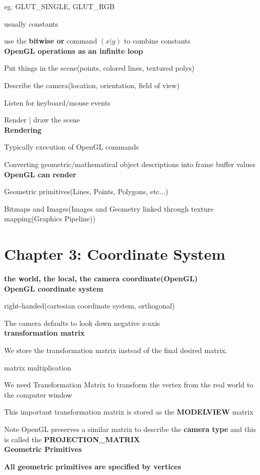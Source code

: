 \documentclass[]{report}
\begin{document}
eg. GLUT\_SINGLE, GLUT\_RGB

usually constants

use the \textbf{bitwise or} command $(x|y)$ to combine constants\\
\textbf{OpenGL operations as an infinite loop}

Put things in the scene(points, colored lines, textured polys)

Describe the camera(location, orientation, field of view)

Listen for keyboard/mouse events

Render | draw the scene\\
\textbf{Rendering}

Typically execution of OpenGL commands

Converting geometric/mathematical object descriptions into frame buffer values\\
\textbf{OpenGL can render}

Geometric primitives(Lines, Points, Polygons, etc...)

Bitmaps and Images(Images and Geometry linked through texture mapping(Graphics Pipeline))


\section*{Chapter 3: Coordinate System}
\textbf{the world, the local, the camera coordinate(OpenGL)}
\\
\textbf{OpenGL coordinate system}

right-handed(cartesian coordinate system, orthogonal)

The camera defaults to look down negative z-axis\\
\textbf{transformation matrix}

We store the transformation matrix instead of the final desired matrix.

matrix multiplication

We need Transformation Matrix to transform the vertex from the real world to the computer window

This important transformation matrix is stored as the \textbf{MODELVIEW} matrix

Note OpenGL preserves a similar matrix to describe the \textbf{camera type} and this is called the \textbf{PROJECTION\_MATRIX}\\
\textbf{Geometric Primitives}

\textbf{All geometric primitives are specified by vertices}
\end{document}
